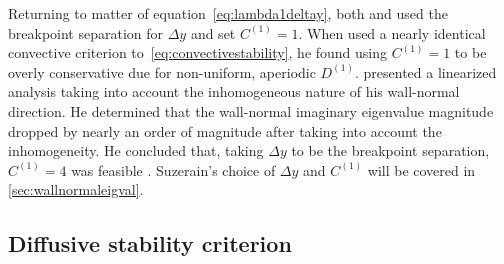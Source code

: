 \documentclass[letterpaper,11pt,nointlimits,reqno,draft]{amsbook}
\begin{document}
Returning to matter of equation~\eqref{eq:lambda1deltay}, both
\citeauthor{Guarini1998} and \citeauthor{Kwok2002} used the breakpoint
separation for $\Delta{}y$ and set $C^{(1)} = 1$.  When
\citeauthor{Venugopal2003} used a nearly identical convective criterion
to~\eqref{eq:convectivestability}, he found using $C^{(1)} = 1$ to be overly
conservative due for non-uniform, aperiodic $D^{(1)}$.
\citet[\textsection{}3.2]{Venugopal2003} presented a linearized analysis taking
into account the inhomogeneous nature of his wall-normal direction.  He
determined that the wall-normal imaginary eigenvalue magnitude dropped by
nearly an order of magnitude after taking into account the inhomogeneity.  He
concluded that, taking $\Delta{}y$ to be the breakpoint separation, $C^{(1)} =
4$ was feasible \citep[equation~3.29]{Venugopal2003}.  Suzerain's choice of
$\Delta{}y$ and $C^{(1)}$ will be covered in
\autoref{sec:wallnormaleigval}.

\subsection{Diffusive stability criterion}
\label{sec:diffusivestability}
\end{document}
